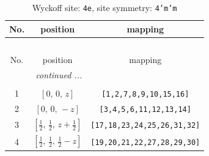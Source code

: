 \documentclass[fleqn,8pt]{jsarticle}
\begin{document}
\renewcommand{\arraystretch}{1.2}
\begin{longtable}{ccc}
\caption{Wyckoff site: {\tt 4e}, site symmetry: {\tt 4'm'm}}
 \\
 \hline \hline
No. & position & mapping \\ \hline \endfirsthead

\multicolumn{2}{l}{\tablename\ \thetable{}} \\
 \hline \hline
No. & position & mapping \\ \hline \endhead

 \hline \hline
\multicolumn{2}{r}{\footnotesize\it continued ...} \\ \endfoot

 \hline \hline
\multicolumn{2}{r}{} \\ \endlastfoot

1 & $\left[ 0,\, 0,\, z \right]$ & {\tt [1,2,7,8,9,10,15,16]} \\ \hline
2 & $\left[ 0,\, 0,\, - z \right]$ & {\tt [3,4,5,6,11,12,13,14]} \\ \hline
3 & $\left[ \frac{1}{2},\, \frac{1}{2},\, z + \frac{1}{2} \right]$ & {\tt [17,18,23,24,25,26,31,32]} \\ \hline
4 & $\left[ \frac{1}{2},\, \frac{1}{2},\, \frac{1}{2} - z \right]$ & {\tt [19,20,21,22,27,28,29,30]} \\
\end{longtable}
\renewcommand{\arraystretch}{1.2}
\end{document}
